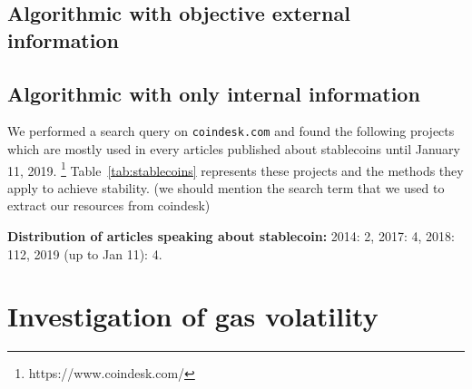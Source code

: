 \subsection{Algorithmic with objective external information}

\subsection{Algorithmic with only internal information}

We performed a search query on \texttt{coindesk.com} and found the following projects which are mostly used in every articles published about stablecoins until January 11, 2019. \footnote{https://www.coindesk.com/} Table~\ref{tab:stablecoins} represents these projects and the methods they apply to achieve stability. (we should mention the search term that we used to extract our resources from coindesk)


\textbf{Distribution of articles speaking about stablecoin:} 2014: 2, 2017: 4, 2018: 112, 2019 (up to Jan 11): 4.



\section{Investigation of gas volatility}


